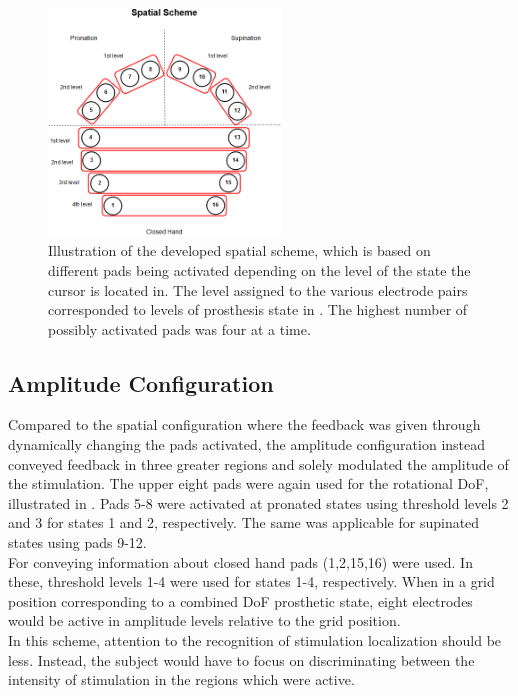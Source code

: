 \begin{figure}[H]                 
	\includegraphics[width=0.55\textwidth]{figures/El_array_spatial}  
	\caption{Illustration of the developed spatial scheme, which is based on different pads being activated depending on the level of the state the cursor is located in. The level assigned to the various electrode pairs corresponded to levels of prosthesis state in . The highest number of possibly activated pads was four at a time.}
	\label{fig:spatial} 
\end{figure}


\subsection{Amplitude Configuration}

Compared to the spatial configuration where the feedback was given through dynamically changing the pads activated, the amplitude configuration instead conveyed feedback in three greater regions and solely modulated the amplitude of the stimulation. The upper eight pads were again used for the rotational DoF, illustrated in . Pads 5-8 were activated at pronated states using threshold levels 2 and 3 for states 1 and 2, respectively. The same was applicable for supinated states using pads 9-12. \\
For conveying information about closed hand pads (1,2,15,16) were used. In these, threshold levels 1-4 were used for states 1-4, respectively. When in a grid position corresponding to a combined DoF prosthetic state, eight electrodes would be active in amplitude levels relative to the grid position. \\ In this scheme, attention to the recognition of stimulation localization should be less. Instead, the subject would have to focus on discriminating between the intensity of stimulation in the regions which were active.          

